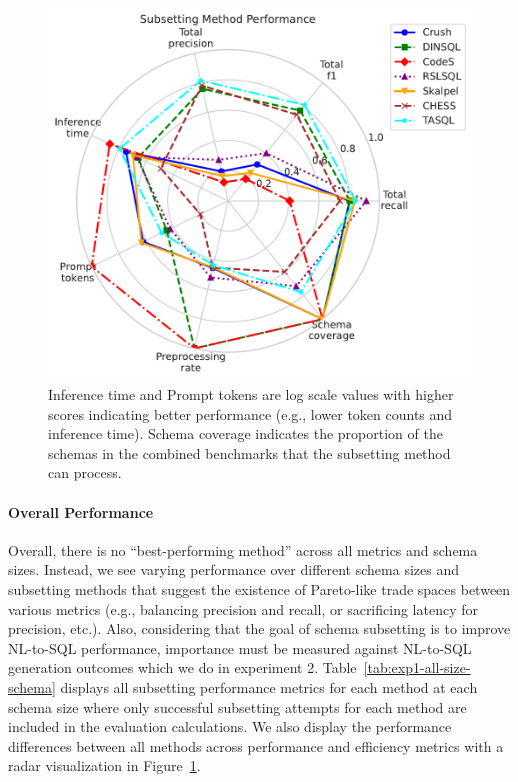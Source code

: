 \begin{figure}
  \centering
  \includegraphics[width=\linewidth]{figures/subsetting_method_performance_radar.pdf}
  \caption{Inference time and Prompt tokens are log scale values with higher scores indicating better performance (e.g., lower token counts and inference time). Schema coverage indicates the proportion of the schemas in the combined benchmarks that the subsetting method can process.}
  \label{fig:subsetting-performance_radar}
\end{figure}

\paragraph{\textbf{Overall Performance}}
Overall, there is no ``best-performing method'' across all metrics and schema sizes.
Instead, we see varying performance over different schema sizes and subsetting methods that suggest the existence of Pareto-like trade spaces between various metrics (e.g., balancing precision and recall, or sacrificing latency for precision, etc.).
Also, considering that the goal of schema subsetting is to improve NL-to-SQL performance, importance must be measured against NL-to-SQL generation outcomes which we do in experiment 2.
Table~\ref{tab:exp1-all-size-schema} displays all subsetting performance metrics for each method at each schema size where only successful subsetting attempts for each method are included in the evaluation calculations.
We also display the performance differences between all methods across performance and efficiency metrics with a radar visualization in Figure~\ref{fig:subsetting-performance_radar}.

